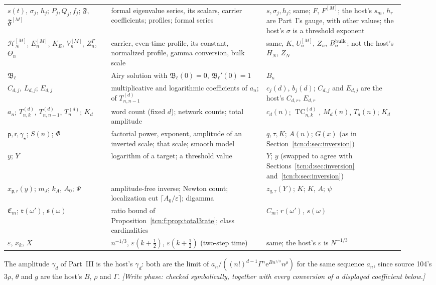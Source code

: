 \documentclass[11pt,letterpaper]{article}
\newcommand{\eps}{\varepsilon}
\newcommand{\ee}{\mathrm e}
\newcommand{\TC}{\operatorname{TC}}
\theoremstyle{remark}
\begin{document}
\begin{longtable}{@{}>{\raggedright}p{0.24\linewidth}>{\raggedright}p{0.36\linewidth}>{\raggedright\arraybackslash}p{0.32\linewidth}@{}}
$s(t)$, $\sigma_j$, $h_j$; $P_j,Q_j,f_j$; $\mathfrak F$, $\mathfrak F^{[M]}$ & formal eigenvalue series, its scalars, carrier coefficients; profiles; formal series & $s,\sigma_j,h_j$; same; $F$, $F^{[M]}$; the host's $s_m$, $h_r$ are Part~I's gauge, with other values; the host's $\sigma$ is a threshold exponent\\
$\mathcal H_N^{[M]}$, $E_n^{[M]}$, $K_E$, $V_n^{[M]}$, $Z^\Gamma_n$, $\Theta_n$ & carrier, even-time profile, its constant, normalized profile, gamma conversion, bulk scale & same, $K$, $U_n^{[M]}$, $Z_n$, $B_n^{\rm bulk}$; not the host's $H_N$, $Z_N$\\
$\mathfrak B_\ell$ & Airy solution with $\mathfrak B_\ell(0)=0$, $\mathfrak B_\ell'(0)=1$ & $B_\kappa$\\
$C_{d,j}$, $L_{d,j}$; $E_{d,j}$ & multiplicative and logarithmic coefficients of $a_n$; of $T^{(d)}_{n,n-1}$ & $c_j(d)$, $b_j(d)$; $C_{d,j}$ and $E_{d,j}$ are the host's $C_{d,r}$, $E_{d,r}$\\
$a_n$; $T^{(d)}_{n,k}$, $T^{(d)}_{n,n-1}$, $T^{(d)}_n$; $K_d$ & word count (fixed $d$); network counts; total amplitude & $c_d(n)$; $\TC^{(d)}_{n,k}$, $M_d(n)$, $T_d(n)$; $K_d$\\
$\mathsf p,\mathsf r,\gamma_\star$; $S(n)$; $\Phi$ & factorial power, exponent, amplitude of an inverted scale; that scale; smooth model & $q,\tau,K$; $A(n)$; $G(x)$ (as in Section~\ref{tcn:d:sec:inversion})\\
$y$; $Y$ & logarithm of a target; a threshold value & $Y$; $y$ (swapped to agree with Sections~\ref{tcn:d:sec:inversion} and~\ref{tcn:b:sec:inversion})\\
$\hat x_{\mathsf p,\mathsf r}(y)$; $m_J$; $k_A$, $A_0$; $\Psi$ & amplitude-free inverse; Newton count; localization cut $\lceil A_0/\eps\rceil$; digamma & $z_{q,\tau}(Y)$; $K$; $K$, $A$; $\psi$\\
$\mathfrak C_m$; $\mathfrak r(\omega')$, $\mathfrak s(\omega)$ & ratio bound of Proposition~\ref{tcn:f:prop:total3rate}; class cardinalities & $C_m$; $r(\omega')$, $s(\omega)$\\
$\eps$, $x_k$, $X$ & $n^{-1/3}$, $\eps(k+\frac12)$, $\eps(k+\frac12)$ (two-step time) & same; the host's $\eps$ is $N^{-1/3}$\\
\bottomrule
\end{longtable}
\endgroup
The amplitude $\gamma_d$ of Part~III is the host's $\gamma_d$: both are the limit of $a_n/((n!)^{d-1}\Gamma^n\ee^{Bn^{1/3}}n^\rho)$ for the same sequence $a_n$, since source 104's $3\rho$, $\theta$ and $g$ are the host's $B$, $\rho$ and $\Gamma$. \emph{[Write phase: checked symbolically, together with every conversion of a displayed coefficient below.]}
\end{document}
